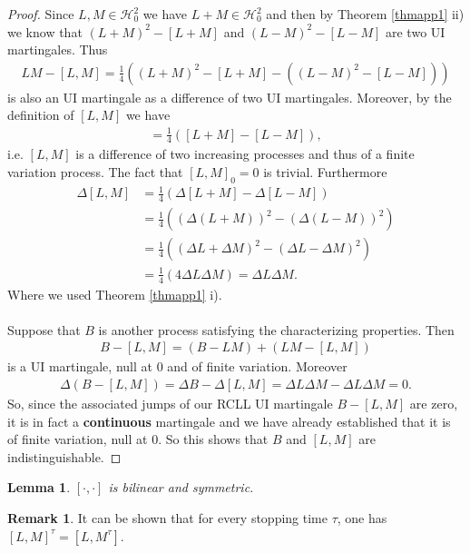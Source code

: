 \documentclass[12pt,a4paper, twoside]{article}
\newtheorem{lem}{Lemma}[section]
\theoremstyle{definition}
\newtheorem{rem}{Remark}[section]
\begin{document}
\begin{proof}
Since $L,M \in \mathcal{H}_0^2 $ we have $L+M \in \mathcal{H}_0^2$ and then by Theorem \ref{thmapp1} ii) we know that $(L+M)^2-[L+M]$ and $(L-M)^2 -[L-M]$ are two UI martingales. Thus
\begin{align*}
LM-[L,M] = \frac{1}{4}((L+M)^2-[L+M]-((L-M)^2-[L-M]))
\end{align*}
is also an UI martingale as a difference of two UI martingales. Moreover, by the definition of $[L,M]$ we have
\begin{align*}
[L,M] = \frac{1}{4}( [L+M]-[L-M]),
\end{align*}
i.e. $[L,M]$ is a difference of two increasing processes and thus of a finite variation process. The fact that $[L,M]_0=0$ is trivial. Furthermore
\begin{align*}
\Delta[L,M]&= \frac{1}{4}( \Delta [L+M]-\Delta[L-M]) \\
&= \frac{1}{4}( (\Delta(L+M))^2- ( \Delta(L-M))^2)  \\
& = \frac{1}{4}(( \Delta L + \Delta M)^2- ( \Delta L- \Delta M)^2 )  \\
& = \frac{1}{4} ( 4 \Delta L \Delta M) = \Delta L \Delta M. 
\end{align*}
Where we used Theorem \ref{thmapp1} i). 
\\\\
Suppose that $B$ is another process satisfying the characterizing properties. Then
\begin{align*}
B-[L,M]=(B-LM)+(LM-[L,M])
\end{align*}
is a UI martingale, null at $0$ and of finite variation. Moreover
\begin{align*}
\Delta ( B- [L,M]) = \Delta B - \Delta [L,M] = \Delta L \Delta M - \Delta L \Delta M =0.
\end{align*}
So, since the associated jumps of our RCLL UI martingale $B-[L,M]$ are zero, it is in fact a \textbf{continuous} martingale and we have already established that it is of finite variation, null at $0$. So this shows that $B$ and $[L,M]$ are indistinguishable.  
\end{proof}
\newpage
\begin{lem} $[ \cdot ,  \cdot]$ is bilinear and symmetric.
\end{lem}
\begin{rem} It can be shown that for every stopping time $\tau$, one has $[L,M]^\tau = [L,M^\tau]$. 
\end{rem}
\end{document}
